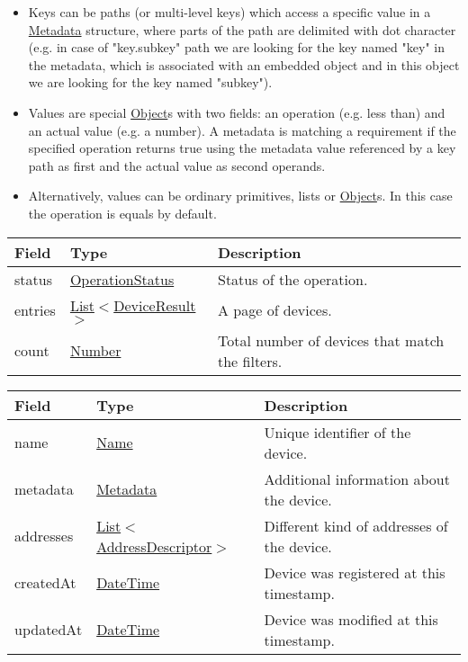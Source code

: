 \documentclass[a4paper]{arrowhead}
\newcommand{\pref}[1]{{\textcolor{ArrowheadGrey}{\hyperref[sec:model:primitives:#1]{#1}}}}
\begin{document}
\begin{itemize}
    \item Keys can be paths (or multi-level keys) which access a specific value in a \hyperref[sec:model:Metadata]{Metadata} structure, where parts of the path are delimited with dot character (e.g. in case of "key.subkey" path we are looking for the key named "key" in the metadata, which is associated with an embedded object and in this object we are looking for the key named "subkey").
    \item Values are special \pref{Object}s with two fields: an operation (e.g. less than) and an actual value (e.g. a number). A metadata is matching a requirement if the specified operation returns true using the metadata value referenced by a key path as first and the actual value as second operands. 
    \item Alternatively, values can be ordinary primitives, lists or \pref{Object}s. In this case the operation is equals by default.
\end{itemize}

\clearpage

\label{sec:model:DeviceListResponse}

\begin{table}[ht!]
\begin{tabularx}{\textwidth}{| p{2.5cm} | p{3.1cm} | X |} \hline
\rowcolor{gray!33} Field & Type      & Description \\ \hline
status & \pref{OperationStatus} & Status of the operation. \\ \hline
entries & \pref{List}$<$\hyperref[sec:model:DeviceResult]{DeviceResult}$>$ & A page of devices. \\ \hline
count & \pref{Number} & Total number of devices that match the filters. \\ \hline
\end{tabularx}
\end{table}

\label{sec:model:DeviceResult}
 
\begin{table}[ht!]
\begin{tabularx}{\textwidth}{| p{2.5cm} | p{4cm} | X |} \hline
\rowcolor{gray!33} Field & Type      & Description \\ \hline
name & \pref{Name} & Unique identifier of the device. \\ \hline
metadata & \hyperref[sec:model:Metadata]{Metadata} & Additional information about the device. \\ \hline
addresses &  \pref{List}$<$\hyperref[sec:model:AddressDescriptor]{AddressDescriptor}$>$ & Different kind of addresses of the device.  \\ \hline
createdAt & \pref{DateTime} & Device was registered at this timestamp. \\ \hline
updatedAt & \pref{DateTime} & Device was modified at this timestamp. \\ \hline
\end{tabularx}
\end{table}
\end{document}
